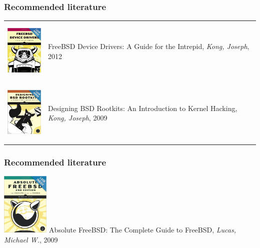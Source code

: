 \documentclass{beamer}
\begin{document}
\begin{frame}
\frametitle{Recommended literature}
\begin{center}
\begin{tabular}{ p{3cm} p{6cm} }
\includegraphics[height=3cm]{img/book_drivers.jpg} &
FreeBSD Device Drivers: A Guide for the Intrepid,
\textit{Kong, Joseph}, 2012 \\
\includegraphics[height=3cm]{img/book_rootkits.jpg} &
Designing BSD Rootkits: An Introduction to Kernel Hacking,
\textit{Kong, Joseph}, 2009 \\
\end{tabular}
\end{center}
\end{frame}

\begin{frame}
\frametitle{Recommended literature}
\center\includegraphics[height=3cm]{img/book_absolute.jpg}
Absolute FreeBSD: The Complete Guide to FreeBSD,
\textit{Lucas, Michael W.}, 2009 \\
\end{frame}
\end{document}
